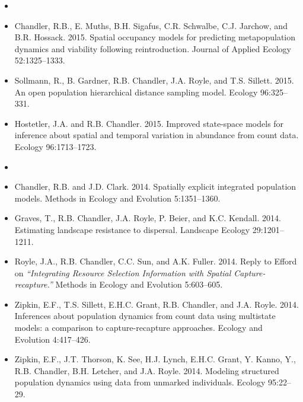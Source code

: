 \begin{itemize}

\item[] { \\}

\item Chandler, R.B., E. Muths, B.H. Sigafus, C.R. Schwalbe,
  C.J. Jarchow, and B.R. Hossack. 2015. Spatial occupancy models for
  predicting metapopulation dynamics and viability following
  reintroduction. Journal of Applied Ecology 52:1325--1333.

\item Sollmann, R., B. Gardner, R.B. Chandler, J.A. Royle, and
  T.S. Sillett. 2015. An open population hierarchical
  distance sampling model. Ecology 96:325--331.

\item Hostetler, J.A. and R.B. Chandler. 2015. Improved
  state-space models for inference about spatial and temporal
  variation in abundance from count data. Ecology 96:1713--1723.

\item[] { \\}

\item Chandler, R.B. and J.D. Clark. 2014. Spatially
  explicit integrated population models. Methods in Ecology and
  Evolution 5:1351--1360.

\item Graves, T., R.B. Chandler, J.A. Royle, P. Beier, and
  K.C. Kendall. 2014. Estimating landscape resistance to
  dispersal. Landscape Ecology 29:1201--1211.

\item Royle, J.A., R.B. Chandler, C.C. Sun, and A.K. Fuller. 2014. 
  Reply to Efford on   {\it ``Integrating Resource Selection
    Information with Spatial Capture-recapture.''} Methods in Ecology
  and Evolution 5:603--605. 

\item Zipkin, E.F., T.S. Sillett, E.H.C. Grant, R.B. Chandler, and
  J.A. Royle. 2014. Inferences about population dynamics
  from count data using multistate models: a comparison to
  capture-recapture approaches. Ecology and Evolution 4:417--426.

\item Zipkin, E.F., J.T. Thorson, K. See, H.J. Lynch, E.H.C. Grant,
  Y. Kanno, Y., R.B. Chandler, B.H. Letcher, and J.A. Royle.
  2014. Modeling structured population dynamics using
  data from unmarked individuals. Ecology 95:22--29.


\end{itemize}
